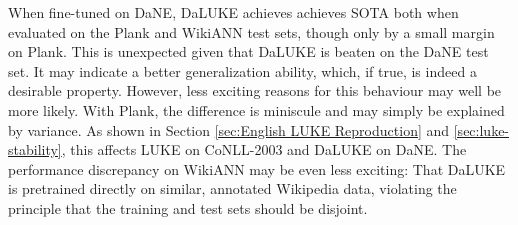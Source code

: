 \documentclass[main.tex]{subfiles}
\begin{document}
When fine-tuned on DaNE, DaLUKE achieves achieves SOTA both when evaluated on the Plank and WikiANN test sets, though only by a small margin on Plank.
This is unexpected given that DaLUKE is beaten on the DaNE test set.
It may indicate a better generalization ability, which, if true, is indeed a desirable property.
However, less exciting reasons for this behaviour may well be more likely.
With Plank, the difference is miniscule and may simply be explained by variance.
As shown in Section \ref{sec:English LUKE Reproduction} and \ref{sec:luke-stability}, this affects LUKE on CoNLL-2003 and DaLUKE on DaNE.
The performance discrepancy on WikiANN may be even less exciting:
That DaLUKE is pretrained directly on similar, annotated Wikipedia data, violating the principle that the training and test sets should be disjoint.
\end{document}
